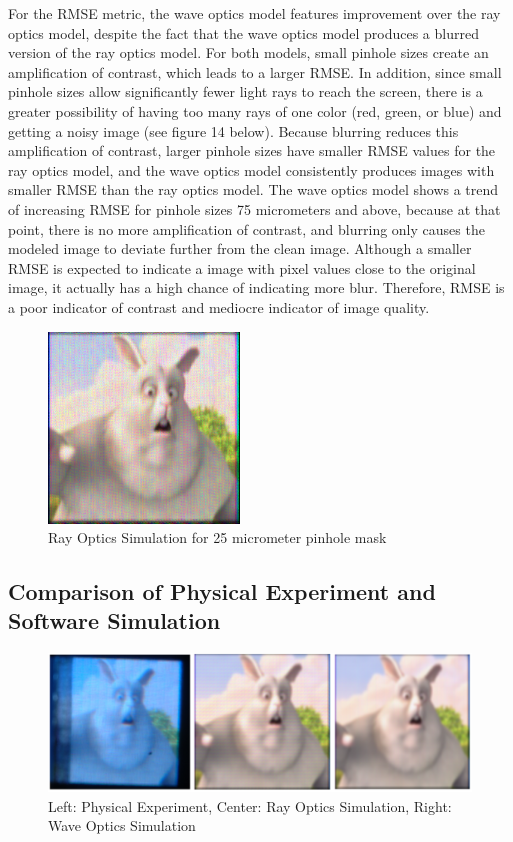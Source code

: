 For the RMSE metric, the wave optics model features improvement over the ray optics model, despite the fact that the wave optics model produces a blurred version of the ray optics model. For both models, small pinhole sizes create an amplification of contrast, which leads to a larger RMSE. In addition, since small pinhole sizes allow significantly fewer light rays to reach the screen, there is a greater possibility of having too many rays of one color (red, green, or blue) and getting a noisy image (see figure 14 below). Because blurring reduces this amplification of contrast, larger pinhole sizes have smaller RMSE values for the ray optics model, and the wave optics model consistently produces images with smaller RMSE than the ray optics model. The wave optics model shows a trend of increasing RMSE for pinhole sizes 75 micrometers and above, because at that point, there is no more amplification of contrast, and blurring only causes the modeled image to deviate further from the clean image. Although a smaller RMSE is expected to indicate a image with pixel values close to the original image, it actually has a high chance of indicating more blur. Therefore, RMSE is a poor indicator of contrast and mediocre indicator of image quality. 

\begin{figure}[ht]
  \centering
  \includegraphics[width=2in]{chapters/chapter8/images/simulationResult_25.png}
  \caption{Ray Optics Simulation for 25 micrometer pinhole mask}
  \label{fig:ferrari}
\end{figure}

\subsection{Comparison of Physical Experiment and Software Simulation}

\begin{figure}[ht]
  \centering
  \includegraphics[width=5in]{chapters/chapter8/images/Comparison.png}
  \caption{Left: Physical Experiment, Center: Ray Optics Simulation, Right: Wave Optics Simulation}
  \label{fig:ferrari}
\end{figure}


